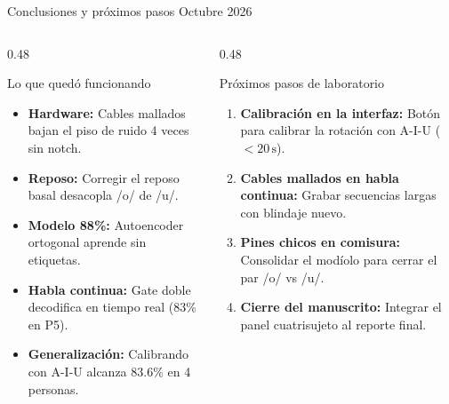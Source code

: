 \documentclass[aspectratio=169,10pt]{beamer}
\begin{document}
\begin{frame}{Conclusiones y próximos pasos \hfill \textnormal{\footnotesize Octubre 2026}}
    \begin{columns}[t]
        \begin{column}{0.48\textwidth}
            \small
            \begin{block}{Lo que quedó funcionando}
                \begin{itemize}
                    \item \textbf{Hardware:} Cables mallados bajan el piso de ruido 4 veces sin notch.
                    \item \textbf{Reposo:} Corregir el reposo basal desacopla /o/ de /u/.
                    \item \textbf{Modelo 88\%:} Autoencoder ortogonal aprende sin etiquetas.
                    \item \textbf{Habla continua:} Gate doble decodifica en tiempo real (83\% en P5).
                    \item \textbf{Generalización:} Calibrando con A-I-U alcanza 83.6\% en 4 personas.
                \end{itemize}
            \end{block}
        \end{column}
        \begin{column}{0.48\textwidth}
            \small
            \begin{block}{Próximos pasos de laboratorio}
                \begin{enumerate}
                    \item \textbf{Calibración en la interfaz:} Botón para calibrar la rotación con A-I-U ($<20\,\text{s}$).
                    \item \textbf{Cables mallados en habla continua:} Grabar secuencias largas con blindaje nuevo.
                    \item \textbf{Pines chicos en comisura:} Consolidar el modíolo para cerrar el par /o/ vs /u/.
                    \item \textbf{Cierre del manuscrito:} Integrar el panel cuatrisujeto al reporte final.
                \end{enumerate}
            \end{block}
        \end{column}
    \end{columns}
\end{frame}
\end{document}
